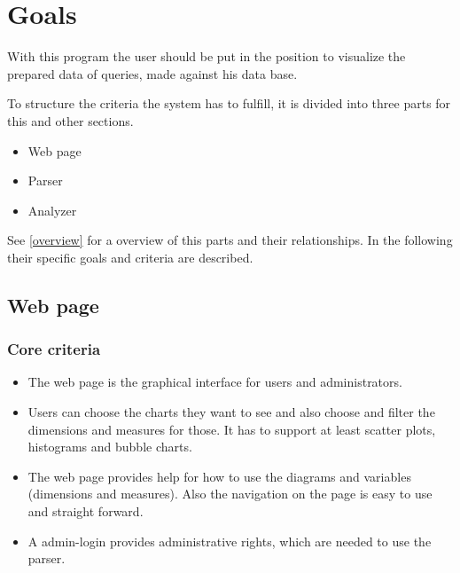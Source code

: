 \section{Goals}


With this program the user should be put in the position 
to visualize the prepared data of queries, made against his data base.


To structure the criteria the system has to fulfill, 
it is divided into three parts for this and other sections.
\begin{itemize}
  \item Web page
  \item Parser
  \item Analyzer
\end{itemize}
See \ref{overview} for a overview of this parts and their relationships.
In the following their specific goals and criteria are described.
 

% 


\subsection{Web page}
\subsubsection{Core criteria}
\begin{itemize}
\item The web page is the graphical interface for users and administrators. 

\item Users can choose the charts they want to see 
and also choose and filter the dimensions and measures for those. 
It has to support at least scatter plots, histograms and bubble charts.

\item The web page provides help for how to use the diagrams and variables (dimensions 
and measures). 
Also the navigation on the page is easy to use and straight forward.

\item A admin-login provides administrative rights, which are needed to use the parser.
\end{itemize}

